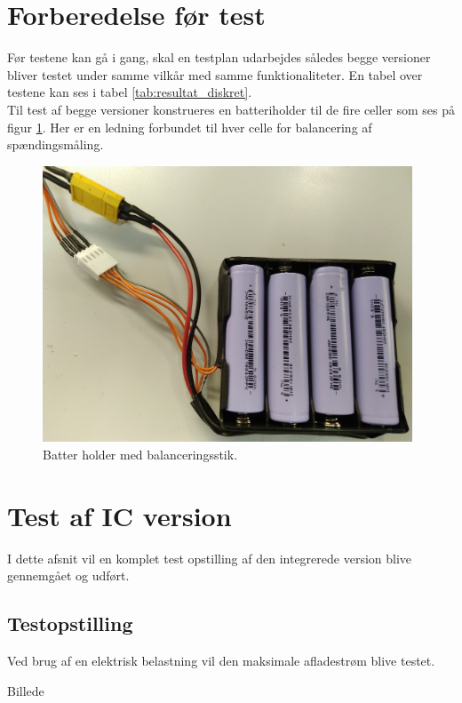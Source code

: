 \section{Forberedelse før test}\label{afs:tests}
Før testene kan gå i gang, skal en testplan udarbejdes således begge versioner bliver testet under samme vilkår med samme funktionaliteter. En tabel over testene kan ses i tabel \ref{tab:resultat_diskret}.
\\

Til test af begge versioner konstrueres en batteriholder til de fire celler som ses på figur \ref{fig:battery_holder}. Her er en ledning forbundet til hver celle for balancering af spændingsmåling.

\begin{figure}[h]
	\centering
	\includegraphics[width=11cm]{billeder/battery_holder.jpg}
	\caption{Batter holder med balanceringsstik.}
	\label{fig:battery_holder}
\end{figure}

\section{Test af IC version}\label{afs:test_ic}
I dette afsnit vil en komplet test opstilling af den integrerede version blive gennemgået og udført.

\subsection{Testopstilling}
Ved brug af en elektrisk belastning vil den maksimale afladestrøm blive testet.



Billede





